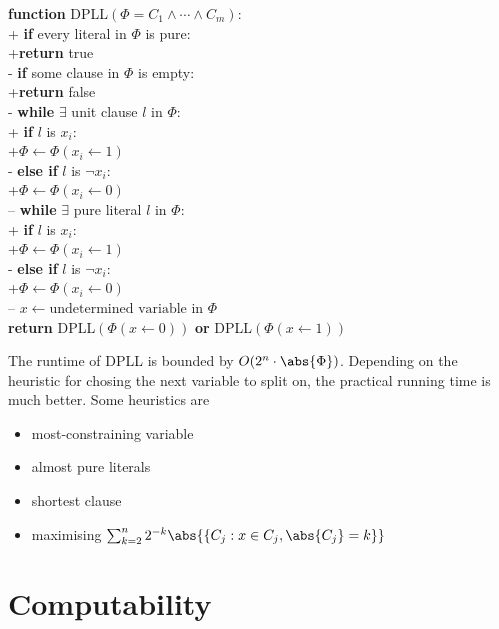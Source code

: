 \documentclass{article}
\begin{document}
\begin{pseudo}
	\textbf{function} \textsf{DPLL}$(\Phi=C_1\wedge\cdots\wedge C_m)$:\\+
	\textbf{if} every literal in $\Phi$ is pure:\\+\textbf{return} \textsf{true}\\-
	\textbf{if} some clause in $\Phi$ is empty:\\+\textbf{return} \textsf{false}\\-
	\textbf{while} $\exists$ unit clause $l$ in $\Phi$:\\+
	\textbf{if} $l$ is $x_i$:\\+$\Phi\leftarrow\Phi(x_i\leftarrow 1)$\\-
	\textbf{else if} $l$ is $\neg x_i$:\\+$\Phi\leftarrow\Phi(x_i\leftarrow 0)$\\--
	\textbf{while} $\exists$ pure literal $l$ in $\Phi$:\\+
	\textbf{if} $l$ is $x_i$:\\+$\Phi\leftarrow\Phi(x_i\leftarrow 1)$\\-
	\textbf{else if} $l$ is $\neg x_i$:\\+$\Phi\leftarrow\Phi(x_i\leftarrow 0)$\\--
	$x\leftarrow\text{undetermined variable in }\Phi$\\
	\textbf{return} \textsf{DPLL}$(\Phi(x\leftarrow 0))$
	\textbf{or}     \textsf{DPLL}$(\Phi(x\leftarrow 1))$
\end{pseudo}

\begin{theorem}
	The runtime of DPLL is bounded by $O(2^n\cdot\abs{\Phi})$. Depending on the
	heuristic for chosing the next variable to split on, the practical running
	time is much better. Some heuristics are
	\begin{itemize}
		\item most-constraining variable
		\item almost pure literals
		\item shortest clause
		\item maximising $\sum_{k=2}^n 2^{-k} \abs{\{C_j : x\in C_j, \abs{C_j}=k\}}$
	\end{itemize}
\end{theorem}

\section{Computability}
\end{document}
